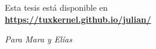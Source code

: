 \documentclass[14pt,twoside,final]{extbook} %
\begin{document}
\setcounter{page}{1} %
\parindent=5mm %
\parskip=0mm %
\newcommand{\nota}[1]{\marginpar{\color{blue}\tiny #1}} %
\newpage
\pagestyle{empty}

\newpage
\pagestyle{empty}
\null\vfill
\noindent Esta tesis está disponible en \faGithub \\

\noindent\textbf{\url{https://tuxkernel.github.io/julian/}}
\newpage
\pagestyle{empty}
\hspace*{0pt}
\vspace*{42pt}
\begin{flushright}
\textit{Para Mara y Elías} 
\end{flushright}
\newpage
\pagestyle{empty}
\null\vfill
\end{document}
